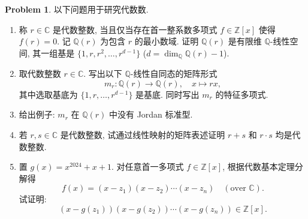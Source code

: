 \documentclass{MainStyle}
\theoremstyle{definition}
\newtheorem{problem}{Problem}
\begin{document}
\begin{problem}
以下问题用于研究代数数.
\begin{enumerate}
    \item 称 $r\in \mathbb C$ 是代数整数, 当且仅当存在首一整系数多项式 $f\in \mathbb Z[x]$ 使得 $f(r)=0$. 记 $\mathbb Q(r)$ 为包含 $r$ 的最小数域. 证明 $\mathbb Q(r)$ 是有限维 $\mathbb Q$-线性空间, 其一组基是 $\{1,r,r^2,\ldots, r^{d-1}\}$ ($d=\dim_{\mathbb Q}\mathbb Q(r)-1$).
    \item 取代数整数 $r\in \mathbb C$. 写出以下 $\mathbb Q$-线性自同态的矩阵形式
          \begin{equation}
              m_r:\mathbb Q(r)\to \mathbb Q(r),\quad x\mapsto rx,
          \end{equation}
          其中选取基底为 $\{1,r,\ldots, r^{d-1}\}$ 是基底. 同时写出 $m_r$ 的特征多项式.
    \item 给出例子: $m_r$ 在 $\mathbb Q(r)$ 中没有 Jordan 标准型.
    \item 若 $r,s\in \mathbb C$ 是代数整数, 试通过线性映射的矩阵表述证明 $r+s$ 和 $r\cdot s$ 均是代数整数.
    \item 置 $g(x)=x^{2024}+x+1$. 对任意首一多项式 $f\in \mathbb Z[x]$, 根据代数基本定理分解得
          \begin{equation}
              f(x)=(x-z_1)(x-z_2)\cdots (x-z_n)\quad (\text{over }\mathbb C).
          \end{equation}
          试证明:
          \begin{equation}
              (x-g(z_1))(x-g(z_2))\cdots (x-g(z_n))\in \mathbb Z[x].
          \end{equation}
\end{enumerate}
\end{problem}
\end{document}
